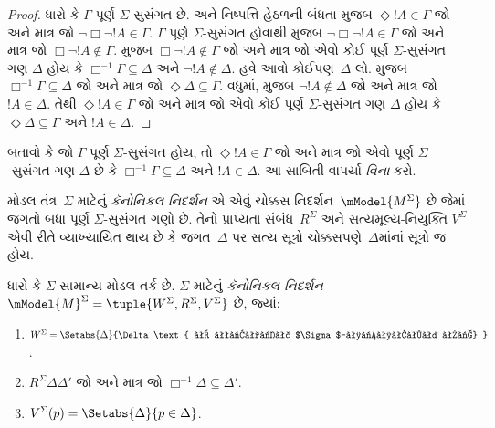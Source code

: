 \begin{proof}
ધારો કે $\Gamma$ પૂર્ણ $\Sigma$-સુસંગત છે. \Dual{} અને નિષ્પત્તિ
હેઠળની બંધતા મુજબ $\Diamond!A \in \Gamma$ જો અને માત્ર જો
$\lnot\Box\lnot !A \in \Gamma$. $\Gamma$ પૂર્ણ
$\Sigma$-સુસંગત હોવાથી
 મુજબ
$\lnot\Box\lnot !A \in \Gamma$ જો અને માત્ર જો
$\Box\lnot !A \notin \Gamma$.  મુજબ
$\Box\lnot !A \notin \Gamma$ જો અને માત્ર જો એવો કોઈ પૂર્ણ
$\Sigma$-સુસંગત ગણ $\Delta$ હોય કે $\Box^{-1}\Gamma
\subseteq \Delta$ અને $\lnot!A \notin \Delta$. હવે આવો
કોઈપણ~$\Delta$ લો.  મુજબ
$\Box^{-1}\Gamma \subseteq \Delta$ જો અને માત્ર જો
$\Diamond\Delta \subseteq \Gamma$. વધુમાં,
 મુજબ
$\lnot !A \notin \Delta$ જો અને માત્ર જો $!A \in \Delta$.
તેથી $\Diamond!A \in \Gamma$ જો અને માત્ર જો એવો કોઈ પૂર્ણ
$\Sigma$-સુસંગત ગણ $\Delta$ હોય કે $\Diamond\Delta
\subseteq \Gamma$ અને $!A \in \Delta$.
\end{proof}


\begin{prob}
  બતાવો કે જો $\Gamma$ પૂર્ણ $\Sigma$-સુસંગત હોય, તો
  $\Diamond !A \in \Gamma$ જો અને માત્ર જો એવો પૂર્ણ
    $\Sigma$-સુસંગત ગણ $\Delta$ છે કે $\Box^{-1}\Gamma
    \subseteq \Delta$ અને $!A \in \Delta$. આ સાબિતી
   વાપર્યા \emph{વિના} કરો.
\end{prob}
\endgroup

\begingroup
\makeatletter{}\makeatother


\label{guunit:OLP-0446}


મોડલ તંત્ર~$\Sigma$ માટેનું \emph{કૅનોનિકલ નિદર્શન} એ એવું ચોક્કસ
નિદર્શન~$\mModel{M^\Sigma}$ છે જેમાં જગતો બધા પૂર્ણ
$\Sigma$-સુસંગત ગણો છે. તેનો પ્રાપ્યતા સંબંધ~$R^\Sigma$ અને
સત્યમૂલ્ય-નિયુક્તિ $V^\Sigma$ એવી રીતે વ્યાખ્યાયિત થાય છે કે
જગત~$\Delta$ પર સત્ય સૂત્રો ચોક્કસપણે~$\Delta$માંનાં
સૂત્રો જ હોય.

\begin{defn}
  ધારો કે $\Sigma$ સામાન્ય મોડલ તર્ક છે. $\Sigma$ માટેનું
  \emph{કૅનોનિકલ નિદર્શન} $\mModel{M}^\Sigma =
  \tuple{W^\Sigma, R^\Sigma, V^\Sigma}$ છે, જ્યાં:
  \begin{enumerate}
  \item $W^\Sigma = \Setabs{ \Delta }{\Delta \text{
      એ પૂર્ણ $\Sigma$-સુસંગત છે} }$.
  \item $R^\Sigma \Delta\Delta'$ જો અને માત્ર જો
    $\Box^{-1}\Delta \subseteq
      \Delta'$.
  \item $V^\Sigma(p) = \Setabs{\Delta}{p \in \Delta}$.
  \end{enumerate}
\end{defn}
\endgroup


